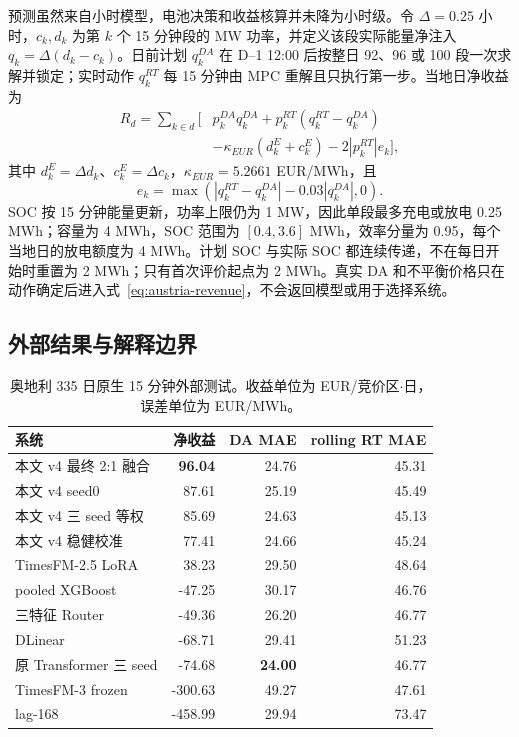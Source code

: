 \documentclass[UTF8,a4paper,11pt,fontset=fandol]{ctexart}
\newcommand{\best}[1]{\textbf{#1}}
\begin{document}
预测虽然来自小时模型，电池决策和收益核算并未降为小时级。令 $\Delta=0.25$ 小时，$c_k,d_k$ 为第 $k$ 个 15 分钟段的 MW 功率，并定义该段实际能量净注入 $q_k=\Delta(d_k-c_k)$。日前计划 $q_k^{DA}$ 在 D--1 12:00 后按整日 92、96 或 100 段一次求解并锁定；实时动作 $q_k^{RT}$ 每 15 分钟由 MPC 重解且只执行第一步。当地日净收益为
\begin{equation}
\begin{aligned}
R_d=\sum_{k\in d}\Big[
&p_k^{DA}q_k^{DA}+p_k^{RT}(q_k^{RT}-q_k^{DA})\\
&-\kappa_{EUR}(d_k^{E}+c_k^{E})
-2|p_k^{RT}|e_k
\Big],
\end{aligned}
\label{eq:austria-revenue}
\end{equation}
其中 $d_k^{E}=\Delta d_k$、$c_k^{E}=\Delta c_k$，$\kappa_{EUR}=5.2661$ EUR/MWh，且
\begin{equation}
e_k=\max\!\left(|q_k^{RT}-q_k^{DA}|-0.03|q_k^{DA}|,0\right).
\end{equation}
SOC 按 15 分钟能量更新，功率上限仍为 1 MW，因此单段最多充电或放电 0.25 MWh；容量为 4 MWh，SOC 范围为 $[0.4,3.6]$ MWh，效率分量为 0.95，每个当地日的放电额度为 4 MWh。计划 SOC 与实际 SOC 都连续传递，不在每日开始时重置为 2 MWh；只有首次评价起点为 2 MWh。真实 DA 和不平衡价格只在动作确定后进入式~\eqref{eq:austria-revenue}，不会返回模型或用于选择系统。

\subsection{外部结果与解释边界}

\begin{table}[H]
\centering
\caption{奥地利 335 日原生 15 分钟外部测试。收益单位为 EUR/竞价区$\cdot$日，误差单位为 EUR/MWh。}
\label{tab:austria-ranking}
\footnotesize
\begin{tabular}{lrrr}
\toprule
系统 & 净收益 & DA MAE & rolling RT MAE \\
\midrule
本文 v4 最终 2:1 融合 & \best{96.04} & 24.76 & 45.31 \\
本文 v4 seed0 & 87.61 & 25.19 & 45.49 \\
本文 v4 三 seed 等权 & 85.69 & 24.63 & 45.13 \\
本文 v4 稳健校准 & 77.41 & 24.66 & 45.24 \\
TimesFM-2.5 LoRA & 38.23 & 29.50 & 48.64 \\
pooled XGBoost & -47.25 & 30.17 & 46.76 \\
三特征 Router & -49.36 & 26.20 & 46.77 \\
DLinear & -68.71 & 29.41 & 51.23 \\
原 Transformer 三 seed & -74.68 & \best{24.00} & 46.77 \\
TimesFM-3 frozen & -300.63 & 49.27 & 47.61 \\
lag-168 & -458.99 & 29.94 & 73.47 \\
\bottomrule
\end{tabular}
\end{table}
\end{document}
